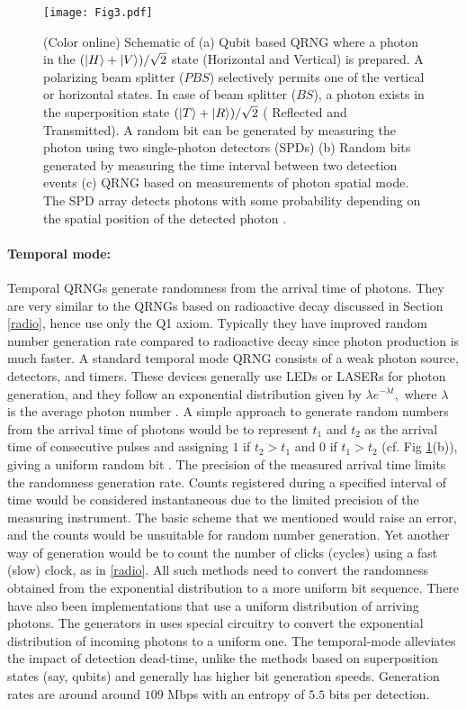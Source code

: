 \documentclass[]{interact}
\theoremstyle{plain}%
\theoremstyle{definition}
\theoremstyle{remark}
\begin{document}
\begin{figure}[tb]
    \texttt{[image: Fig3.pdf]}
    \caption{ (Color online) Schematic of (a) Qubit based QRNG where a photon in the $(\ket{H}+\ket{V})/\sqrt{2}$ state (Horizontal and  Vertical)  is  prepared. A polarizing beam splitter ($PBS$) selectively permits one of the vertical or horizontal states. In case of beam splitter ($BS$), a photon exists in the superposition state $(\ket{T}+\ket{R})/\sqrt{2}$ ( Reflected and Transmitted). A random bit can be generated by measuring the photon using two single-photon detectors (SPDs)  (b) Random bits generated by measuring the time interval between two detection events (c) QRNG based on measurements of photon spatial mode. The SPD array detects photons with some probability depending on the spatial position of the detected photon \cite{ma2016quantum}.} 
    \label{fig3}
    \end{figure}

\paragraph{Temporal mode:} Temporal QRNGs generate randomness from the arrival time of photons. They are very similar to the QRNGs based on radioactive decay discussed in Section \ref{radio}, hence use only the Q1 axiom. Typically they have improved random number generation rate compared to radioactive decay since photon production is much faster. A standard temporal mode QRNG consists of a weak photon source, detectors, and timers. These devices generally use LEDs or LASERs for photon generation, and they follow an exponential distribution given by $\lambda e^{-\lambda t},$
where $\lambda$ is the average photon number
\cite{nie2014practical}. A simple approach to generate random numbers from the arrival time of photons would be to represent $t_1$
and $t_2$ as the arrival time of
consecutive pulses and assigning $1$ if $t_2 > t_1$ and $0$ if $t_1 > t_2$  (cf. Fig \ref{fig3}(b)),
giving a uniform random bit \cite{stipvcevic2007quantum,khanmohammadi2015monolithic}. The precision of the measured arrival time limits the randomness generation rate. Counts registered during a specified interval of time would be considered instantaneous due to the limited precision of the measuring instrument. The basic scheme that we mentioned would raise an error, and the counts would be unsuitable for random number generation. Yet another way of generation would be to count the number of clicks (cycles) using a fast (slow) clock, as in \ref{radio}. All such methods need to convert the randomness obtained from the exponential distribution to a more uniform bit sequence. There have also been implementations that use a uniform distribution of arriving photons. The generators in \cite{Wayne:10} uses special circuitry to convert the exponential distribution of incoming photons to a uniform one. The temporal-mode alleviates the impact of detection dead-time, unlike the methods based on superposition states (say, qubits) and generally has higher bit generation speeds. Generation rates are around around $109$ Mbps \cite{nie2014practical}  with an entropy of $5.5$ bits per detection.
\end{document}
